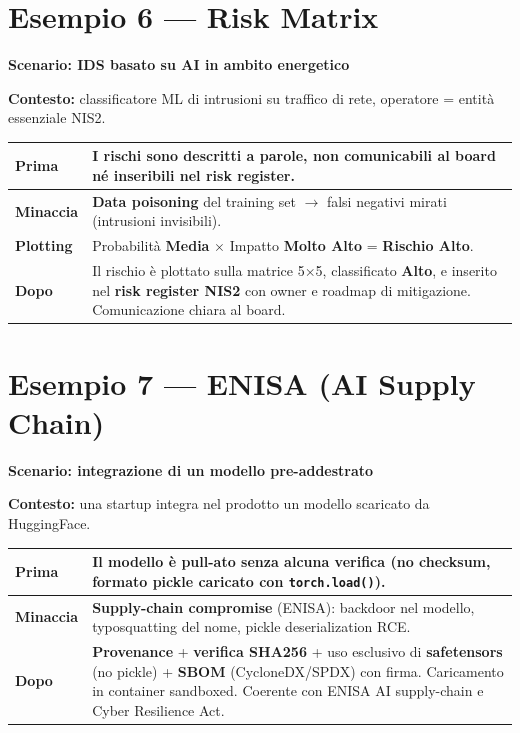 \documentclass[11pt, a4paper]{article}
\begin{document}
\section*{Esempio 6 — Risk Matrix}
\textbf{Scenario: IDS basato su AI in ambito energetico}

\textbf{Contesto:} classificatore ML di intrusioni su traffico di rete, operatore = entità essenziale NIS2.

\noindent
\begin{tabularx}{\textwidth}{|>{\bfseries}l|X|}
\hline
Prima & I rischi sono descritti a parole, non comunicabili al board né inseribili nel risk register. \\ \hline
Minaccia & \textbf{Data poisoning} del training set $\rightarrow$ falsi negativi mirati (intrusioni invisibili). \\ \hline
Plotting & Probabilità \textbf{Media} $\times$ Impatto \textbf{Molto Alto} = \textbf{Rischio Alto}. \\ \hline
Dopo & Il rischio è plottato sulla matrice 5$\times$5, classificato \textbf{Alto}, e inserito nel \textbf{risk register NIS2} con owner e roadmap di mitigazione. Comunicazione chiara al board. \\ \hline
\end{tabularx}

\section*{Esempio 7 — ENISA (AI Supply Chain)}
\textbf{Scenario: integrazione di un modello pre-addestrato}

\textbf{Contesto:} una startup integra nel prodotto un modello scaricato da HuggingFace.

\noindent
\begin{tabularx}{\textwidth}{|>{\bfseries}l|X|}
\hline
Prima & Il modello è pull-ato senza alcuna verifica (no checksum, formato pickle caricato con \texttt{torch.load()}). \\ \hline
Minaccia & \textbf{Supply-chain compromise} (ENISA): backdoor nel modello, typosquatting del nome, pickle deserialization RCE. \\ \hline
Dopo & \textbf{Provenance} + \textbf{verifica SHA256} + uso esclusivo di \textbf{safetensors} (no pickle) + \textbf{SBOM} (CycloneDX/SPDX) con firma. Caricamento in container sandboxed. Coerente con ENISA AI supply-chain e Cyber Resilience Act. \\ \hline
\end{tabularx}
\end{document}
